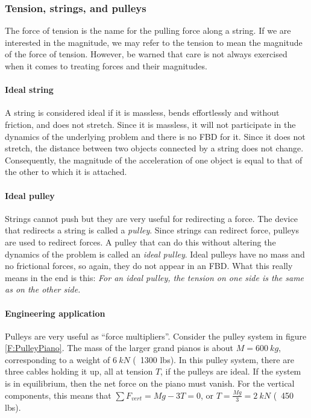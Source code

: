 \subsubsection{Tension, strings, and pulleys}\label{S:Tension}
The force of tension is the name for the pulling force along a string. If we are interested in the magnitude, we may refer to the tension to mean the magnitude of the force of tension. However, be warned that care is not always exercised when it comes to treating forces and their magnitudes.

\paragraph{Ideal string}
A string is considered ideal if it is massless, bends effortlessly and without friction, and does not stretch. Since it is massless, it will not participate in the dynamics of the underlying problem and there is no FBD for it. Since it does not stretch, the distance between two objects connected by a string does not change. Consequently, the magnitude of the acceleration of one object is equal to that of the other to which it is attached. 

\paragraph{Ideal pulley}
Strings cannot push but they are very useful for redirecting a force. 
The device that redirects a string is called a {\em pulley}. Since strings can redirect force, pulleys are used to redirect forces. A pulley that can do this without altering the dynamics of the problem is called an {\em ideal pulley}. 
Ideal pulleys have no mass and no frictional forces, so again, they do not appear in an FBD. 
What this really means in the end is this: {\em For an ideal pulley, the tension on one side is the same as on the other side.}


\paragraph{Engineering application}
Pulleys are very useful as “force multipliers”. Consider the pulley system in figure \ref{F:PulleyPiano}. The mass of the larger grand pianos is about $M = 600\ kg$, corresponding to a weight of $6\ kN$ (~1300 lbs). In this pulley system, there are three cables holding it up, all at tension $T$, if the pulleys are ideal. If the system is in equilibrium, then the net force on the piano must vanish. For the vertical components, this means that $∑ F_{vert} = Mg - 3T = 0$, or $T = \frac{Mg}3 = 2\ kN$ (~450 lbs).

